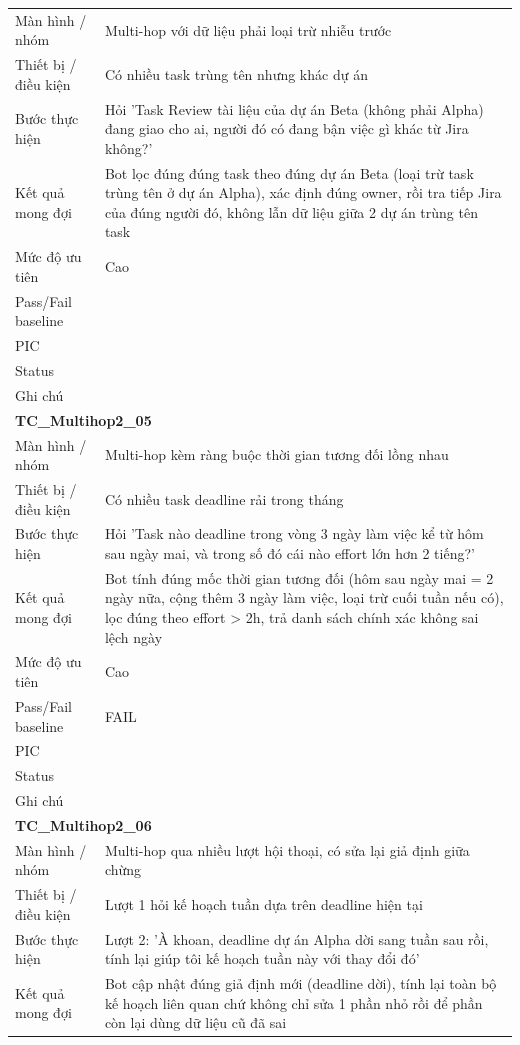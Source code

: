 \documentclass[12pt,a4paper]{article}
\begin{document}
\begin{longtable}{p{3.0cm}p{11.5cm}}
Màn hình / nhóm & Multi-hop với dữ liệu phải loại trừ nhiễu trước \\
Thiết bị / điều kiện & Có nhiều task trùng tên nhưng khác dự án \\
Bước thực hiện & Hỏi 'Task Review tài liệu của dự án Beta (không phải Alpha) đang giao cho ai, người đó có đang bận việc gì khác từ Jira không?' \\
Kết quả mong đợi & Bot lọc đúng đúng task theo đúng dự án Beta (loại trừ task trùng tên ở dự án Alpha), xác định đúng owner, rồi tra tiếp Jira của đúng người đó, không lẫn dữ liệu giữa 2 dự án trùng tên task \\
Mức độ ưu tiên & Cao \\
Pass/Fail baseline &  \\
PIC &  \\
Status &  \\
Ghi chú &  \\
\midrule
\multicolumn{2}{l}{\textbf{TC\_Multihop2\_05}} \\
Màn hình / nhóm & Multi-hop kèm ràng buộc thời gian tương đối lồng nhau \\
Thiết bị / điều kiện & Có nhiều task deadline rải trong tháng \\
Bước thực hiện & Hỏi 'Task nào deadline trong vòng 3 ngày làm việc kể từ hôm sau ngày mai, và trong số đó cái nào effort lớn hơn 2 tiếng?' \\
Kết quả mong đợi & Bot tính đúng mốc thời gian tương đối (hôm sau ngày mai = 2 ngày nữa, cộng thêm 3 ngày làm việc, loại trừ cuối tuần nếu có), lọc đúng theo effort > 2h, trả danh sách chính xác không sai lệch ngày \\
Mức độ ưu tiên & Cao \\
Pass/Fail baseline & FAIL \\
PIC &  \\
Status &  \\
Ghi chú &  \\
\midrule
\multicolumn{2}{l}{\textbf{TC\_Multihop2\_06}} \\
Màn hình / nhóm & Multi-hop qua nhiều lượt hội thoại, có sửa lại giả định giữa chừng \\
Thiết bị / điều kiện & Lượt 1 hỏi kế hoạch tuần dựa trên deadline hiện tại \\
Bước thực hiện & Lượt 2: 'À khoan, deadline dự án Alpha dời sang tuần sau rồi, tính lại giúp tôi kế hoạch tuần này với thay đổi đó' \\
Kết quả mong đợi & Bot cập nhật đúng giả định mới (deadline dời), tính lại toàn bộ kế hoạch liên quan chứ không chỉ sửa 1 phần nhỏ rồi để phần còn lại dùng dữ liệu cũ đã sai \\

\end{longtable}
\end{document}
